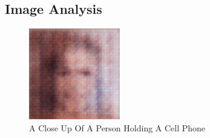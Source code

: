 \documentclass{article}%
\begin{document}
%
\subsection{Image Analysis}%
\label{subsec:ImageAnalysis}%


\begin{figure}[h!]%
\centering%
\includegraphics[width=150px]{500_fake_images/samples_5_369.png}%
\caption{A Close Up Of A Person Holding A Cell Phone}%
\end{figure}

%
\end{document}
